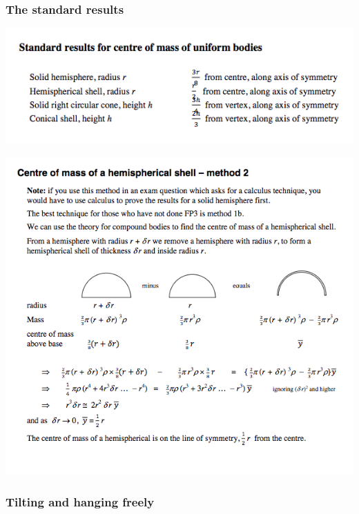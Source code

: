 \documentclass[a4paper]{article}
\begin{document}
\subsubsection{The standard results}
\begin{center}
    \includegraphics[scale=0.5]{img_M/14_intro5}
\end{center}
\begin{center}
    \includegraphics[scale=0.5]{img_M/14_intro6}
\end{center}

\subsubsection{Tilting and hanging freely}
\end{document}
